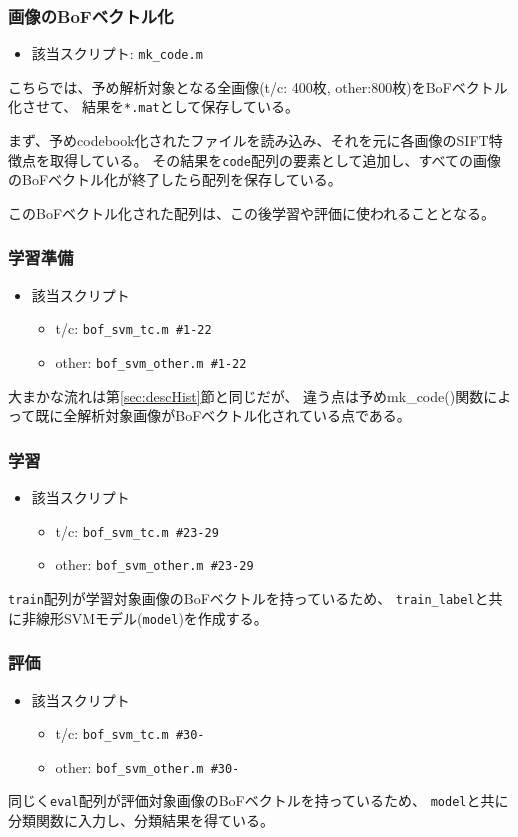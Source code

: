 \documentclass[11pt,a4paper, uplatex]{jsreport}
\begin{document}
\subsubsection{画像のBoFベクトル化}
\begin{itemize}
  \item 該当スクリプト: \texttt{mk_code.m}
\end{itemize}
こちらでは、予め解析対象となる全画像(t/c: 400枚, other:800枚)をBoFベクトル化させて、
結果を\texttt{*.mat}として保存している。

まず、予めcodebook化されたファイルを読み込み、それを元に各画像のSIFT特徴点を取得している。
その結果を\texttt{code}配列の要素として追加し、すべての画像のBoFベクトル化が終了したら配列を保存している。

このBoFベクトル化された配列は、この後学習や評価に使われることとなる。

\subsubsection{学習準備}
\begin{itemize}
  \item 該当スクリプト
  \begin{itemize}
    \item t/c: \texttt{bof_svm_tc.m \#1-22}
    \item other: \texttt{bof_svm_other.m \#1-22}
  \end{itemize}
\end{itemize}
大まかな流れは第\ref{sec:descHist}節と同じだが、
違う点は予めmk_code()関数によって既に全解析対象画像がBoFベクトル化されている点である。
\subsubsection{学習}
\begin{itemize}
  \item 該当スクリプト
  \begin{itemize}
    \item t/c: \texttt{bof_svm_tc.m \#23-29}
    \item other: \texttt{bof_svm_other.m \#23-29}
  \end{itemize}
\end{itemize}
\texttt{train}配列が学習対象画像のBoFベクトルを持っているため、
\texttt{train_label}と共に非線形SVMモデル(\texttt{model})を作成する。
\subsubsection{評価}
\begin{itemize}
  \item 該当スクリプト
  \begin{itemize}
    \item t/c: \texttt{bof_svm_tc.m \#30-}
    \item other: \texttt{bof_svm_other.m \#30-}
  \end{itemize}
\end{itemize}
同じく\texttt{eval}配列が評価対象画像のBoFベクトルを持っているため、
\texttt{model}と共に分類関数に入力し、分類結果を得ている。
\end{document}
